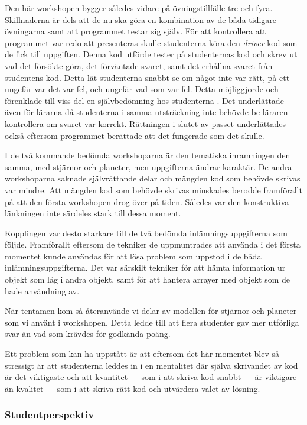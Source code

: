 \documentclass[a4paper, 10pt]{article}
\begin{document}
Den här workshopen bygger således vidare på 
övningstillfälle tre och fyra. Skillnaderna är
dels att de nu ska göra en kombination av de 
båda tidigare övningarna samt att programmet 
testar sig själv. För att kontrollera att 
programmet var redo att presenteras skulle 
studenterna köra den \textit{driver}-kod som 
de fick till uppgiften. Denna kod utförde 
tester på studenternas kod och skrev ut vad 
det försökte göra, det förväntade svaret, 
samt det erhållna svaret från studentens 
kod. Detta lät studenterna snabbt se om något 
inte var rätt, på ett ungefär var det var fel, 
och ungefär vad som var fel. Detta möjliggjorde 
och förenklade till viss del en självbedömning 
hos studenterna \parencite[sida 278]{elmgrenolding2025}.
Det underlättade även för lärarna då 
studenterna i samma utsträckning inte behövde 
be läraren kontrollera om svaret var korrekt. 
Rättningen i slutet av passet underlättades också 
eftersom programmet berättade att det fungerade 
som det skulle.

I de två kommande bedömda workshoparna är den 
tematiska inramningen den samma, med stjärnor 
och planeter, men uppgifterna ändrar karaktär.
De andra workshoparna saknade självrättande 
delar och mängden kod som behövde skrivas var 
mindre. Att mängden kod som behövde skrivas 
minskades berodde framförallt på att den första 
workshopen drog över på tiden. Således var den 
konstruktiva länkningen inte särdeles stark 
till dessa moment.

Kopplingen var desto starkare till de två 
bedömda inlämningsuppgifterna som följde. 
Framförallt eftersom de tekniker de uppmuntrades 
att använda i det första momentet kunde 
användas för att lösa problem som uppstod i de 
båda inlämningsuppgifterna. Det var särskilt 
tekniker för att hämta information ur objekt 
som låg i andra objekt, samt för att hantera 
arrayer med objekt som de hade användning av.

När tentamen kom så återanvände vi delar av 
modellen för stjärnor och planeter som vi 
använt i workshopen. Detta ledde till att flera 
studenter gav mer utförliga svar än vad som 
krävdes för godkända poäng.

Ett problem som kan ha uppstått är att eftersom 
det här momentet blev så stressigt är att 
studenterna leddes in i en mentalitet där 
själva skrivandet av kod är det viktigaste och 
att kvantitet --- som i att skriva kod snabbt ---
är viktigare än kvalitet --- som i att skriva 
rätt kod och utvärdera valet av lösning.

\subsubsection{Studentperspektiv}
\end{document}
